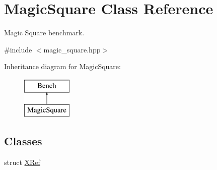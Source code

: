 \hypertarget{classMagicSquare}{\section{\-Magic\-Square \-Class \-Reference}
\label{classMagicSquare}
}


\-Magic \-Square benchmark.  




{\ttfamily \#include $<$magic\-\_\-square.\-hpp$>$}

\-Inheritance diagram for \-Magic\-Square\-:\begin{figure}[H]
\begin{center}
\leavevmode
\includegraphics[height=2.000000cm]{classMagicSquare}
\end{center}
\end{figure}
\subsection*{\-Classes}
\begin{DoxyCompactItemize}
\item 
struct \hyperlink{structMagicSquare_1_1XRef}{\-X\-Ref}
\end{DoxyCompactItemize}
